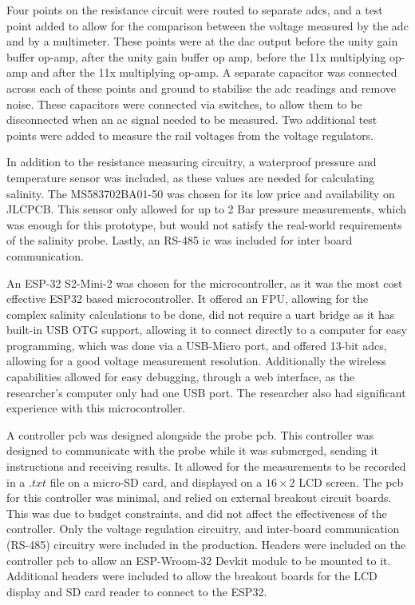 Four points on the resistance circuit were routed to separate \gls{adc}s, and a test point added to allow for the comparison between the voltage measured by the \gls{adc} and by a multimeter.
These points were at the \gls{dac} output before the unity gain buffer op-amp, after the unity gain buffer op amp, before the 11x multiplying op-amp and after the 11x multiplying op-amp.
A separate capacitor was connected across each of these points and ground to stabilise the \gls{adc} readings and remove noise.
These capacitors were connected via switches, to allow them to be disconnected when an \gls{ac} signal needed to be measured.
Two additional test points were added to measure the rail voltages from the voltage regulators.

In addition to the resistance measuring circuitry, a waterproof pressure and temperature sensor was included, as these values are needed for calculating salinity.
The MS583702BA01-50 was chosen for its low price and availability on JLCPCB.
This sensor only allowed for up to 2 Bar pressure measurements, which was enough for this prototype, but would not satisfy the real-world requirements of the salinity probe.
Lastly, an RS-485 \gls{ic} was included for inter board communication.

An ESP-32 S2-Mini-2 was chosen for the microcontroller, as it was the most cost effective ESP32 based microcontroller.
It offered an FPU, allowing for the complex salinity calculations to be done, did not require a \gls{uart} bridge as it has built-in USB OTG support, allowing it to connect directly to a computer for easy programming, which was done via a USB-Micro port, and offered 13-bit \gls{adc}s, allowing for a good voltage measurement resolution.
Additionally the wireless capabilities allowed for easy debugging, through a web interface, as the researcher's computer only had one USB port.
The researcher also had significant experience with this microcontroller.

A controller \gls{pcb} was designed alongside the probe \gls{pcb}.
This controller was designed to communicate with the probe while it was submerged, sending it instructions and receiving results.
It allowed for the measurements to be recorded in a $.txt$ file on a micro-SD card, and displayed on a $16\times2$ LCD screen.
The \gls{pcb} for this controller was minimal, and relied on external breakout circuit boards.
This was due to budget constraints, and did not affect the effectiveness of the controller.
Only the voltage regulation circuitry, and inter-board communication (RS-485) circuitry were included in the production.
Headers were included on the controller \gls{pcb} to allow an ESP-Wroom-32 Devkit module to be mounted to it.
Additional headers were included to allow the breakout boards for the LCD display and SD card reader to connect to the ESP32. 


